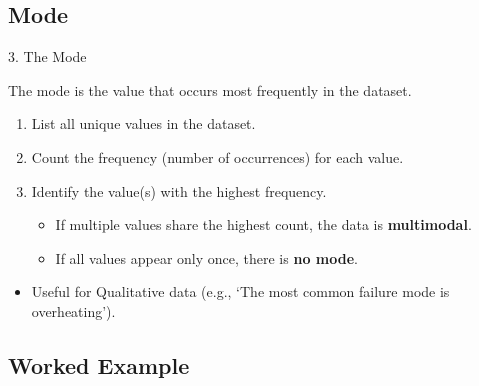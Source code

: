 \subsection{Mode}
\begin{frame}{3. The Mode}
    \begin{definition}[Mode]
        The \alert{mode} is the value that occurs most frequently in the dataset.
    \end{definition}

    \begin{recipe}
        \begin{enumerate}
            \item List all unique values in the dataset.
            \item Count the frequency (number of occurrences) for each value.
            \item Identify the value(s) with the highest frequency.
            \begin{itemize}
                \item If multiple values share the highest count, the data is \textbf{multimodal}.
                \item If all values appear only once, there is \textbf{no mode}.
            \end{itemize}
        \end{enumerate}
    \end{recipe}

    \begin{itemize}
        \item Useful for Qualitative data (e.g., \lq The most common failure mode is overheating\rq).
    \end{itemize}
\end{frame}

\subsection{Worked Example}

